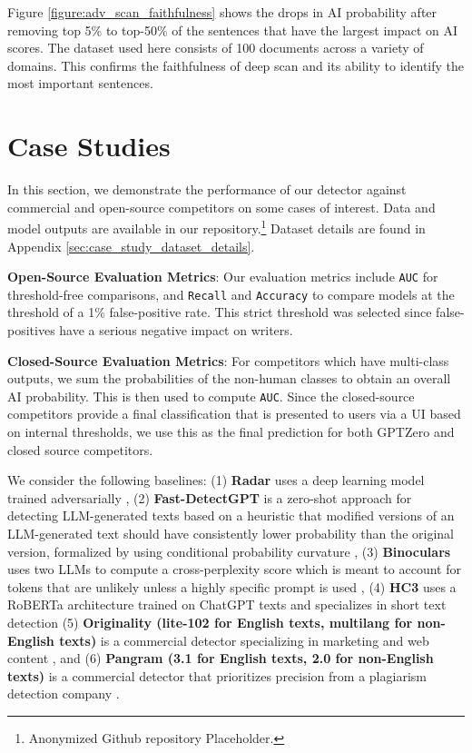 \documentclass[11pt]{article}
\newcommand{\auc}{\texttt{AUC}}
\newcommand{\recall}{\texttt{Recall}}
\newcommand{\accuracy}{\texttt{Accuracy}}
\newcommand{\gptzero}{GPTZero}
\newcommand{\hellosimple}{HC3}
\begin{document}
Figure \ref{figure:adv_scan_faithfulness} shows the drops in AI probability after removing top 5\% to top-50\% of the sentences that have the largest impact on AI scores. The dataset used here consists of 100 documents across a variety of domains. This confirms the faithfulness of deep scan and its ability to identify the most important sentences. 

\section{Case Studies}
In this section, we demonstrate the performance of our detector against commercial and open-source competitors on some cases of interest. 
Data and model outputs are available in our repository.\footnote{
Anonymized Github repository
Placeholder.
}
Dataset details are found in Appendix \ref{sec:case_study_dataset_details}.

\textbf{Open-Source Evaluation Metrics}:
Our evaluation metrics include \auc{} for threshold-free comparisons, and \recall{} and \accuracy{} to compare models at the threshold of a 1\% false-positive rate.
This strict threshold was selected since false-positives have a serious negative impact on writers. 

\textbf{Closed-Source Evaluation Metrics}:
For competitors which have multi-class outputs, we sum the probabilities of the non-human classes to obtain an overall AI probability. This is then used to compute \auc{}. Since the closed-source competitors provide a final classification that is presented to users via a UI based on internal thresholds, we use this as the final prediction for both \gptzero{} and closed source competitors.

We consider the following baselines:
(1) \textbf{Radar} uses a deep learning model trained adversarially \cite{Hu2023-uv},
(2) \textbf{Fast-DetectGPT} is a zero-shot approach for detecting LLM-generated texts based on a heuristic that modified versions of an LLM-generated text should have consistently lower probability than the original version, formalized by using conditional probability curvature \cite{Bao2023-ay},
(3) 
\textbf{Binoculars}
 uses two LLMs to compute a cross-perplexity score which is meant to account for tokens that are unlikely unless a highly specific prompt is used \cite{Hans2024-qb},
(4)
\textbf{\hellosimple} 
 uses a RoBERTa architecture trained on ChatGPT texts and specializes in short text detection \cite{Guo2023-gu}
(5)
\textbf{Originality (lite-102 for English texts, multilang for non-English texts)}
 is a commercial detector specializing in marketing and web content \cite{noauthor_undated-gd}, and
(6)
\textbf{Pangram (3.1 for English texts, 2.0 for non-English texts)}
 is a commercial detector that prioritizes precision from a plagiarism detection company \cite{Emi2024-nq}.
\end{document}
